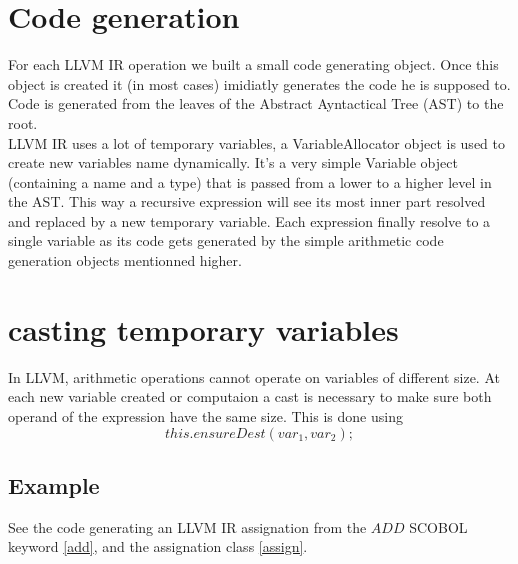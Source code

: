 \newpage\cleardoublepage{}
\section{Code generation}
 
For each LLVM IR operation we built a small code generating object. Once this object is created it (in most cases) imidiatly generates the code he is supposed to.
Code is generated from the leaves of the Abstract Ayntactical Tree (AST) to the root.\\ LLVM IR uses a lot of temporary variables, a VariableAllocator object is used to create new variables name dynamically.
It's a very simple Variable object (containing a name and a type) that is passed from a lower to a higher level in the AST.
This way a recursive expression will see its most inner part resolved and replaced by a new temporary variable. Each expression finally resolve to a single variable as its code gets generated by the simple arithmetic code generation objects mentionned higher.



\section{casting temporary variables}

In LLVM, arithmetic operations cannot operate on variables of different size. At each new variable created or computaion a cast is necessary to make sure both operand of the expression have the same size. This is done using 
$$this.ensureDest(var_1, var_2 );$$

\subsection{Example}
See the code generating an LLVM IR assignation from the $ADD$ SCOBOL keyword \ref{add}, and the assignation class \ref{assign}.



